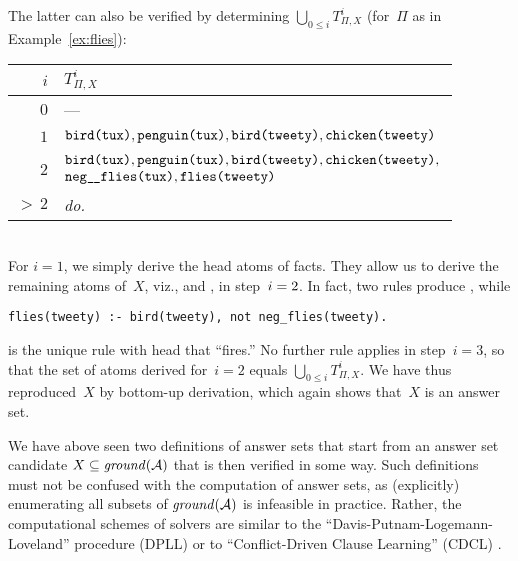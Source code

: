 \begin{example}
The latter can also be verified by determining $\bigcup_{0\leq i}T^i_{\Pi,X}$
(for~$\Pi$ as in Example~\ref{ex:flies}):
\begin{tabular}{@{}r||l}
$i$ & $T^i_{\Pi,X}$
\\\hline\hline
$0$ &
---
\\\hline
$1$ &
$
\begin{array}{@{}l}
\code{\pred{bird}(\const{tux})},
\code{\pred{penguin}(\const{tux})},
\code{\pred{bird}(\const{tweety})},
\code{\pred{chicken}(\const{tweety})}
\end{array}
$
\\\hline
$2$  & 
$
\begin{array}{@{}l@{}}
\code{\pred{bird}(\const{tux})},
\code{\pred{penguin}(\const{tux})},
\code{\pred{bird}(\const{tweety})},
\code{\pred{chicken}(\const{tweety})},\\
\code{\pred{neg\mus flies}(\const{tux})},
\code{\pred{flies}(\const{tweety})}
\end{array}
$
\\\hline
${>\,}2$ &
\textit{do.}
\end{tabular}
\\

\noindent
For $i=1$, we simply derive the head atoms of facts.
They allow us to derive the remaining atoms of~$X$, viz.,
 and
, in step~$i=\nolinebreak2$.
In fact, two rules produce ,
while
\begin{lstlisting}[numbers=none]
flies(tweety) :- bird(tweety), not neg_flies(tweety).
\end{lstlisting}
is the unique rule with head  that ``fires.''
No further rule applies in step~$i=3$,
so that the set of atoms derived for~$i=2$ equals $\bigcup_{0\leq i}T^i_{\Pi,X}$.
We have thus reproduced~$X$ by bottom-up derivation,
which again shows that~$X$ is an answer set.
\eexample
\end{example}

We have above seen two definitions of answer sets that start
from an answer set candidate $X\subseteq\mathit{ground}(\mathcal{A})$
that is then verified in some way.
Such definitions must not be confused with the computation of answer sets,
as (explicitly) enumerating all subsets of $\mathit{ground}(\mathcal{A})$
is infeasible in practice.
Rather, the computational schemes of solvers are similar
to the ``Davis-Putnam-Logemann-Loveland'' procedure (DPLL) \cite{dalolo62a,davput60}
or to ``Conflict-Driven Clause Learning'' (CDCL) \cite{marsak99a,mitchell05a,momazhzhma01a}.

